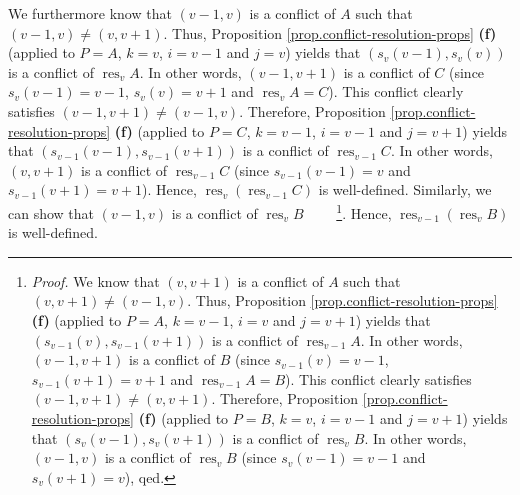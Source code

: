 \documentclass[numbers=enddot,12pt,final,onecolumn,notitlepage]{scrartcl}%
\theoremstyle{definition}
\begin{document}
We furthermore know that $\left(  v-1,v\right)  $ is a conflict of $A$ such
that $\left(  v-1,v\right)  \neq\left(  v,v+1\right)  $. Thus, Proposition
\ref{prop.conflict-resolution-props} \textbf{(f)} (applied to $P=A$, $k=v$,
$i=v-1$ and $j=v$) yields that $\left(  s_{v}\left(  v-1\right)  ,s_{v}\left(
v\right)  \right)  $ is a conflict of $\operatorname*{res}\nolimits_{v}A$. In
other words, $\left(  v-1,v+1\right)  $ is a conflict of $C$ (since
$s_{v}\left(  v-1\right)  =v-1$, $s_{v}\left(  v\right)  =v+1$ and
$\operatorname*{res}\nolimits_{v}A=C$). This conflict clearly satisfies
$\left(  v-1,v+1\right)  \neq\left(  v-1,v\right)  $. Therefore, Proposition
\ref{prop.conflict-resolution-props} \textbf{(f)} (applied to $P=C$, $k=v-1$,
$i=v-1$ and $j=v+1$) yields that $\left(  s_{v-1}\left(  v-1\right)
,s_{v-1}\left(  v+1\right)  \right)  $ is a conflict of $\operatorname*{res}%
\nolimits_{v-1}C$. In other words, $\left(  v,v+1\right)  $ is a conflict of
$\operatorname*{res}\nolimits_{v-1}C$ (since $s_{v-1}\left(  v-1\right)  =v$
and $s_{v-1}\left(  v+1\right)  =v+1$). Hence, $\operatorname*{res}%
\nolimits_{v}\left(  \operatorname*{res}\nolimits_{v-1}C\right)  $ is
well-defined. Similarly, we can show that $\left(  v-1,v\right)  $ is a
conflict of $\operatorname*{res}\nolimits_{v}B$%
\ \ \ \ \footnote{\textit{Proof.} We know that $\left(  v,v+1\right)  $ is a
conflict of $A$ such that $\left(  v,v+1\right)  \neq\left(  v-1,v\right)  $.
Thus, Proposition \ref{prop.conflict-resolution-props} \textbf{(f)} (applied
to $P=A$, $k=v-1$, $i=v$ and $j=v+1$) yields that $\left(  s_{v-1}\left(
v\right)  ,s_{v-1}\left(  v+1\right)  \right)  $ is a conflict of
$\operatorname*{res}\nolimits_{v-1}A$. In other words, $\left(
v-1,v+1\right)  $ is a conflict of $B$ (since $s_{v-1}\left(  v\right)  =v-1$,
$s_{v-1}\left(  v+1\right)  =v+1$ and $\operatorname*{res}\nolimits_{v-1}%
A=B$). This conflict clearly satisfies $\left(  v-1,v+1\right)  \neq\left(
v,v+1\right)  $. Therefore, Proposition \ref{prop.conflict-resolution-props}
\textbf{(f)} (applied to $P=B$, $k=v$, $i=v-1$ and $j=v+1$) yields that
$\left(  s_{v}\left(  v-1\right)  ,s_{v}\left(  v+1\right)  \right)  $ is a
conflict of $\operatorname*{res}\nolimits_{v}B$. In other words, $\left(
v-1,v\right)  $ is a conflict of $\operatorname*{res}\nolimits_{v}B$ (since
$s_{v}\left(  v-1\right)  =v-1$ and $s_{v}\left(  v+1\right)  =v$), qed.}.
Hence, $\operatorname*{res}\nolimits_{v-1}\left(  \operatorname*{res}%
\nolimits_{v}B\right)  $ is well-defined.
\end{document}
